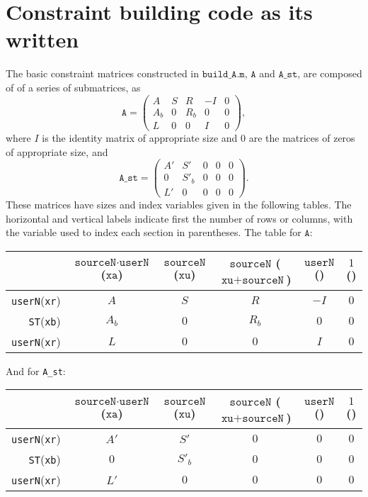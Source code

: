 \documentclass[11pt]{article}
\newcommand{\buildA}{\texttt{build\_A.m}}
\newcommand{\A}{\texttt{A}}
\newcommand{\Ast}{\texttt{A\_st}}
\newcommand{\xr}{\texttt{xr}}
\newcommand{\xb}{\texttt{xb}}
\newcommand{\xa}{\texttt{xa}}
\newcommand{\xu}{\texttt{xu}}
\newcommand{\sourceN}{\texttt{sourceN}}
\newcommand{\userN}{\texttt{userN}}
\newcommand{\ST}{\texttt{ST}}
\begin{document}
\section{Constraint building code as its written}

The basic constraint matrices constructed in $\buildA$, $\A$ and $\Ast$, are composed of of a series of submatrices, as
\[
	\A = 
	\left(
	\begin{array}{ccccc}
		A &   S & R   & -I & 0 \\
		A_b & 0 & R_b &  0 & 0 \\
		L &   0 & 0   &  I & 0
	\end{array}
	\right),
\]
where $I$ is the identity matrix of appropriate size and $0$ are the matrices of zeros of appropriate size, and
\[
	\Ast = 
	\left(
	\begin{array}{ccccc}
		A' & S'   & 0 & 0 & 0 \\
		0  & S'_b & 0 & 0 & 0 \\
		L' & 0    & 0 & 0 & 0
	\end{array}
	\right).
\]
These matrices have sizes and index variables given in the following tables.
The horizontal and vertical labels indicate first the number of rows or columns, with the variable used to index each section in parentheses. 
The table for $\A$:
\begin{center}
	\begin{tabular}{r|c|c|c|c|c}
		& $\sourceN\cdot\userN$ ($\xa$) & $\sourceN$ ($\xu$) & $\sourceN$ ($\xu + \sourceN$) & $\userN$ () & $1$ () \\
		\hline
		\userN (\xr) & $A$   & $S$ & $R$   & $-I$ & $0$ \\
		\ST (\xb)    & $A_b$ & $0$ & $R_b$ & $0$  & $0$ \\
		\userN (\xr) & $L$   & $0$ & $0$   & $I$  & $0$ \\
		\hline
	\end{tabular}
\end{center}

And for \Ast:
\begin{center}
	\begin{tabular}{r|c|c|c|c|c}
		& $\sourceN\cdot\userN$ ($\xa$) & $\sourceN$ ($\xu$) & $\sourceN$ ($\xu + \sourceN$) & $\userN$ () & $1$ () \\
		\hline
		\userN (\xr) & $A'$  & $S'$    & $0$ & $0$ & $0$ \\
		\ST (\xb)    & $0$   & $S'_b$  & $0$ & $0$ & $0$ \\
		\userN (\xr) & $L'$  & $0$     & $0$ & $0$ & $0$ \\
		\hline
	\end{tabular}
\end{center}
\end{document}
